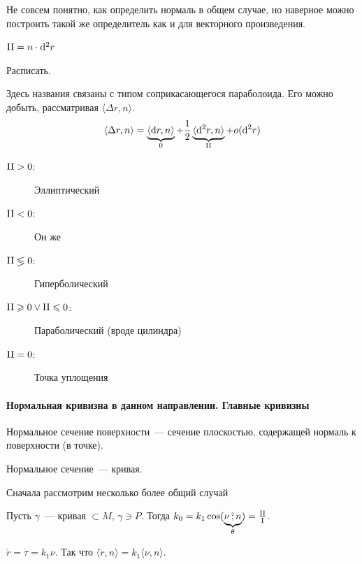 \documentclass[draft,timbord]{longnotes}
\begin{document}
Не совсем понятно, как определить нормаль в общем случае, но наверное
можно построить такой же определитель как и для векторного произведения.

\begin{prop}\label{prop:dg::II}
  ${\rm II} = n \cdot \mathrm{d}^2 r$
\end{prop}
\begin{lproof}
  Расписать.
\end{lproof}

\begin{prop}\label{prop:dg::II::ptypes}
  Здесь названия связаны с типом соприкасающегося параболоида. Его можно добыть, рассматривая
  $\langle \Delta r, n \rangle$.
  \[
    \langle \Delta r ,n \rangle = \underbrace{\langle \mathrm{d} r, n \rangle}_0
    + \frac{1}{2} \underbrace{\langle \mathrm{d}^2 r, n \rangle}_{\rm II} + 
    o(\mathrm{d}^2 r)
  \]
  \begin{description}
    \item[${\rm II} > 0$:] Эллиптический
    \item[${\rm II} < 0$:] Он же
    \item[${\rm II} \lessgtr 0$:] Гиперболический
    \item[${\rm II} \geqslant 0 \lor {\rm II} \leqslant 0$:] Параболический (вроде цилиндра)
    \item[${\rm II} = 0$:] Точка уплощения
  \end{description}
\end{prop}


\paragraph{Нормальная кривизна в данном направлении. Главные кривизны}
\label{par:meas::curfctr}

\begin{defn}\label{defn:meas::curfctr::normsec}
  Нормальное сечение поверхности~--- сечение плоскостью, 
  содержащей нормаль к поверхности (в точке).
\end{defn}

\begin{lem}\label{lem:meas::curfctr::normsec}
  Нормальное сечение~--- кривая.
\end{lem}

Сначала рассмотрим несколько более общий случай

\begin{thrm}[Менье]\label{thrm:meas::curfctr::menie}
  Пусть $\gamma$~--- кривая $ \subset M$, $ \gamma \ni P$.
  Тогда $k_0 = k_1 \cos (\underbrace{\nu \,\text{\^;}\, n}_\theta) = \frac{\rm II}{\rm I} $.
\end{thrm}
\begin{tproof}
  $\ddot r = \dot \tau = k_1 \nu $.
  Так что $\langle \ddot r, n \rangle =  k_1 \langle \nu, n \rangle$.
\end{tproof}
\end{document}
